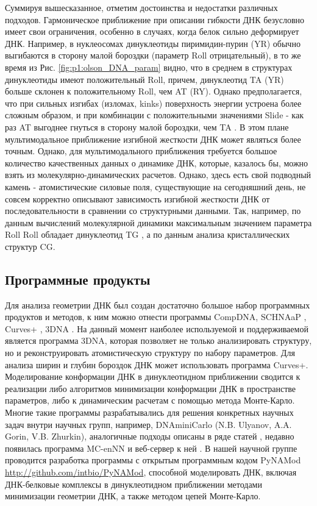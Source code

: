 Суммируя вышесказанное, отметим достоинства и недостатки различных подходов. Гармоническое приближение при описании гибкости ДНК безусловно имеет свои ограничения, особенно в случаях, когда белок сильно деформирует ДНК. Например, в нуклеосомах динуклеотиды  пиримидин-пурин (YR) обычно выгибаются в сторону малой бороздки (параметр Roll отрицательный), в то же время из Рис. \ref{fig:p1:olson_DNA_param} видно, что в среднем в структурах динуклеотиды имеют положительный Roll, причем, динуклеотид TA (YR) больше склонен к положительному Roll, чем AT (RY). Однако предполагается, что при сильных изгибах (изломах, kinks) поверхность энергии устроена более сложным образом, и при комбинации с положительными значениями Slide - как раз AT выгоднее гнуться в сторону малой бороздки, чем TA \cite{wang_sequence-dependent_2010}. В этом плане мультимодальное приближение изгибной жесткости ДНК может являться более точным. Однако, для мультимодального приближения требуется большое количество качественных данных о динамике ДНК, которые, казалось бы, можно взять из молекулярно-динамических расчетов. Однако, здесь есть свой подводный камень - атомистические силовые поля, существующие на сегодняшний день, не совсем корректно описывают зависимость изгибной жесткости ДНК от последовательности в сравнении со структурными данными. Так, например, по данным вычислений молекулярной динамики максимальным значением параметра Roll Roll обладает динуклеотид TG \cite{pasi_muabc_2014}, а по данным анализа кристаллических структур CG.

\subsection{Программные продукты}
Для анализа геометрии ДНК был создан достаточно большое набор программных продуктов и методов, к ним можно отнести программы CompDNA\cite{gorin_b-dna_1995}, SCHNAaP \cite{lu_structure_1997}, Curves+ \cite{lavery_conformational_2009}, 3DNA \cite{lu_3dna_2008}. На данный момент наиболее используемой и поддерживаемой является программа 3DNA, которая позволяет не только анализировать структуру, но и реконструировать атомистическую структуру по набору параметров. Для анализа ширин и глубин бороздок ДНК может использовать программа Curves+.
Моделирование конформации ДНК в динуклеотидном приближении сводится к реализации либо алгоритмов минимизации конформации ДНК в пространстве параметров, либо к динамическим расчетам с помощью метода Монте-Карло. Многие такие программы разрабатывались для решения конкретных научных задач внутри научных групп, например, DNAminiCarlo (N.B. Ulyanov,
A.A. Gorin, V.B. Zhurkin), аналогичные подходы описаны в ряде статей \cite{norouzi_topological_2015,kulaeva_internucleosomal_2012}, недавно появилась программа MC-enNN и веб-сервер к ней \cite{walther_multi-modal_2020}. В нашей научной группе проводится разработка программы с открытым программным кодом PyNAMod
 \url{http://github.com/intbio/PyNAMod}, способной моделировать ДНК, включая ДНК-белковые комплексы в динуклеотидном приближении методами минимизации геометрии ДНК, а также методом цепей Монте-Карло.

